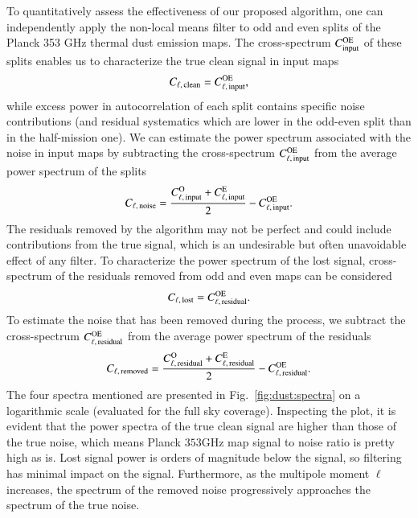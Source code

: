 \documentclass{aa}
\begin{document}
To quantitatively assess the effectiveness of our proposed algorithm, one can independently apply the non-local means filter to odd and even splits of the Planck 353 GHz thermal dust emission maps. The cross-spectrum $C^{\rm OE}_{\rm input}$ of these splits enables us to characterize the true clean signal in input maps
%
\begin{equation}
    C_{\ell, \, \rm clean} = C^{\rm OE}_{\ell, \, \rm input} ,
\end{equation}
%
while excess power in autocorrelation of each split contains specific noise contributions (and residual systematics which are lower in the odd-even split than in the half-mission one). We can estimate the power spectrum associated with the noise in input maps by subtracting the cross-spectrum $C^{\rm OE}_{\ell, \, \rm input}$ from the average power spectrum of the splits
%
\begin{equation}
    C_{\ell, \, \rm noise} = \frac{C^{\rm O}_{\ell, \, \rm input} + C^{\rm E}_{\ell, \, \rm input}}{2} - C^{\rm OE}_{\ell, \, \rm input}.
\end{equation}
%
The residuals removed by the algorithm may not be perfect and could include contributions from the true signal, which is an undesirable but often unavoidable effect of any filter. To characterize the power spectrum of the lost signal, cross-spectrum of the residuals removed from odd and even maps can be considered
%
\begin{equation}
    C_{\ell, \, \rm lost} = C^{\rm OE}_{\ell, \, \rm residual}.
\end{equation}
%
To estimate the noise that has been removed during the process, we subtract the cross-spectrum $C^{\rm OE}_{\ell, \, \rm residual}$ from the average power spectrum of the residuals
%
\begin{equation}
    C_{\ell, \, \rm removed} = \frac{C^{\rm O}_{\ell, \, \rm residual} + C^{\rm E}_{\ell, \, \rm residual}}{2} - C^{\rm OE}_{\ell, \, \rm residual}.
\end{equation}
%
The four spectra mentioned are presented in Fig.~\ref{fig:dust:spectra} on a logarithmic scale (evaluated for the full sky coverage). Inspecting the plot, it is evident that the power spectra of the true clean signal are higher than those of the true noise, which means Planck $353$GHz map signal to noise ratio is pretty high as is. Lost signal power is orders of magnitude below the signal, so filtering has minimal impact on the signal. Furthermore, as the multipole moment $\ell$ increases, the spectrum of the removed noise progressively approaches the spectrum of the true noise.
\end{document}
